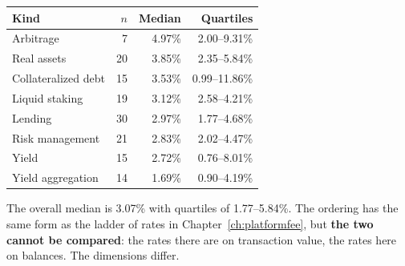 \begin{center}
\begin{tabularx}{\textwidth}{@{}Xrrr@{}}
\toprule
Kind & $n$ & Median & Quartiles \\
\midrule
Arbitrage & 7 & 4.97\% & 2.00--9.31\% \\
Real assets & 20 & 3.85\% & 2.35--5.84\% \\
Collateralized debt & 15 & 3.53\% & 0.99--11.86\% \\
Liquid staking & 19 & 3.12\% & 2.58--4.21\% \\
Lending & 30 & 2.97\% & 1.77--4.68\% \\
Risk management & 21 & 2.83\% & 2.02--4.47\% \\
Yield & 15 & 2.72\% & 0.76--8.01\% \\
Yield aggregation & 14 & 1.69\% & 0.90--4.19\% \\
\bottomrule
\end{tabularx}
\label{tab:protocol-fee-ladder}
\end{center}

The overall median is 3.07\% with quartiles of 1.77--5.84\%. The ordering has the same form
as the ladder of rates in Chapter~\ref{ch:platformfee}, but
\textbf{the two cannot be compared}: the rates there are on transaction value, the rates here
on balances. The dimensions differ.
